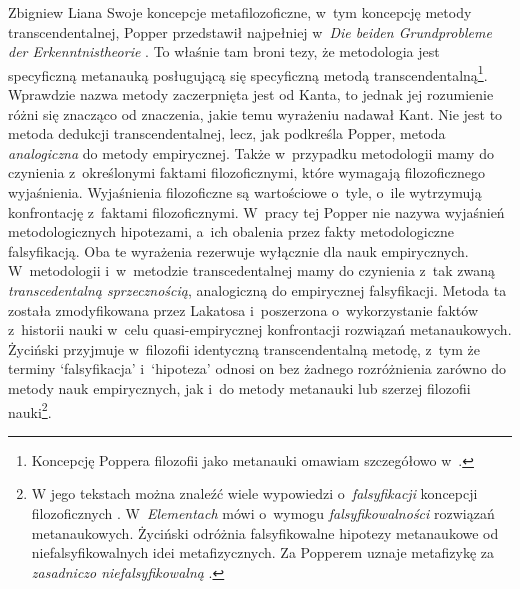 \begin{artplenv}{Zbigniew Liana}
Swoje koncepcje metafilozoficzne, w~tym koncepcję metody transcendentalnej, Popper przedstawił
najpełniej w~\textit{Die beiden Grundprobleme der Erkenntnistheorie}
\parencite*{popper_beiden_1979}.
To właśnie tam broni tezy, że
metodologia jest specyficzną metanauką posługującą się specyficzną metodą transcendentalną\footnote{Koncepcję Poppera
filozofii jako metanauki omawiam szczegółowo w~\parencite{liana_uzasadnienie_2006}.
}. Wprawdzie nazwa metody
zaczerpnięta jest od Kanta, to jednak jej rozumienie różni się znacząco od znaczenia, jakie temu wyrażeniu nadawał
Kant. Nie jest to metoda dedukcji transcendentalnej, lecz, jak podkreśla Popper, metoda \textit{analogiczna} do metody
empirycznej. Także w~przypadku metodologii mamy do czynienia z~określonymi faktami filozoficznymi, które wymagają
filozoficznego wyjaśnienia. Wyjaśnienia filozoficzne są wartościowe o~tyle, o~ile wytrzymują konfrontację z~faktami
filozoficznymi. W~pracy tej Popper nie nazywa wyjaśnień metodologicznych hipotezami, a~ich obalenia przez fakty
metodologiczne falsyfikacją. Oba te wyrażenia rezerwuje wyłącznie dla nauk empirycznych. W~metodologii i~w~metodzie
transcedentalnej mamy do czynienia z~tak zwaną \textit{transcedentalną sprzecznością}, analogiczną do empirycznej
falsyfikacji. Metoda ta została zmodyfikowana przez Lakatosa i~poszerzona o~wykorzystanie faktów z~historii nauki w~celu
quasi-empirycznej konfrontacji rozwiązań metanaukowych. Życiński przyjmuje w~filozofii identyczną transcendentalną
metodę, z~tym że terminy `falsyfikacja' i~`hipoteza' odnosi on bez żadnego rozróżnienia zarówno do metody nauk
empirycznych, jak i~do metody metanauki lub szerzej filozofii nauki\footnote{W jego tekstach można znaleźć wiele
wypowiedzi o~\textit{falsyfikacji }koncepcji filozoficznych
\parencites[s.~177]{zycinski_teizm_1985}[s.~9,12,97,135]{zycinski_structure_1988}[s.~17,22,174,239]{zycinski_struktura_2013}.
W~\textit{Elementach}
\parencite*[s.~166]{zycinski_elementy_1996}
mówi o~wymogu
\textit{falsyfikowalności} rozwiązań metanaukowych. Życiński odróżnia falsyfikowalne hipotezy metanaukowe od
niefalsyfikowalnych idei metafizycznych. Za Popperem uznaje metafizykę za \textit{zasadniczo niefalsyfikowalną}
\parencite[s.~130]{zycinski_elementy_1996}.
}.


\end{artplenv}
